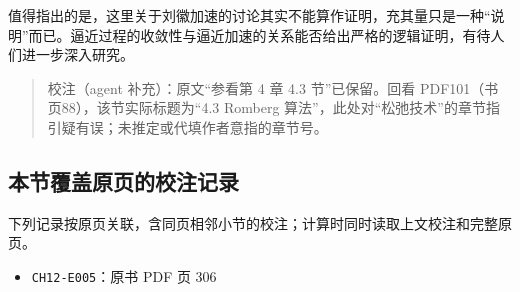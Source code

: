 \documentclass[
  10pt,
  fontset=fandol]{ctexart}
\providecommand{\tightlist}{%
  \setlength{\itemsep}{0pt}\setlength{\parskip}{0pt}}
\begin{document}
值得指出的是，这里关于刘徽加速的讨论其实不能算作证明，充其量只是一种``说明''而已。逼近过程的收敛性与逼近加速的关系能否给出严格的逻辑证明，有待人们进一步深入研究。

\begin{quote}
校注（agent 补充）：原文``参看第 4 章 4.3 节''已保留。回看 PDF101（书页88），该节实际标题为``4.3 Romberg 算法''，此处对``松弛技术''的章节指引疑有误；未推定或代填作者意指的章节号。
\end{quote}

\subsection{本节覆盖原页的校注记录}\label{ux672cux8282ux8986ux76d6ux539fux9875ux7684ux6821ux6ce8ux8bb0ux5f55}

下列记录按原页关联，含同页相邻小节的校注；计算时同时读取上文校注和完整原页。

\begin{itemize}
\tightlist
\item
  \texttt{CH12-E005}：原书 PDF 页 306
\end{itemize}
\end{document}
